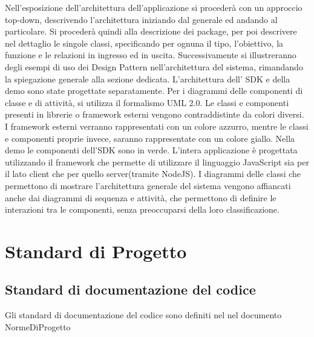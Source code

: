 Nell’esposizione dell’architettura dell’applicazione si procederà con
un approccio top-down, descrivendo l’architettura iniziando dal
generale ed andando al particolare. 
Si procederà quindi alla descrizione dei package, per poi descrivere
nel dettaglio le singole classi, specificando per ognuna il tipo, l’obiettivo, la funzione e
le relazioni in ingresso ed in uscita.
Successivamente si illustreranno degli esempi di uso dei Design
Pattern nell’architettura del sistema, rimandando la spiegazione
generale alla sezione dedicata. 
L'architettura dell' SDK e della demo sono state progettate separatamente.  
Per i diagrammi delle componenti di classe e di attività, si utilizza
il formalismo UML 2.0. Le classi e componenti presenti in librerie o
framework esterni vengono contraddistinte da colori diversi. I
framework esterni verranno rappresentati con un colore azzurro, mentre
le classi e componenti proprie invece, saranno rappresentate con un
colore giallo. Nella demo le componenti dell'SDK sono in verde.
L'intera applicazione è progettata utilizzando il framework
 che permette di utilizzare il linguaggio JavaScript
sia per il lato client che per quello server(tramite NodeJS). 
I diagrammi delle classi che permettono di mostrare l’architettura
generale del sistema vengono affiancati anche dai diagrammi di
sequenza e attività, che permettono di definire le interazioni tra le
componenti, senza preoccuparsi della loro classificazione. 







\section{Standard di Progetto}

\subsection{Standard di documentazione del codice}
Gli standard di documentazione del codice sono definiti nel nel
documento NormeDiProgetto %

